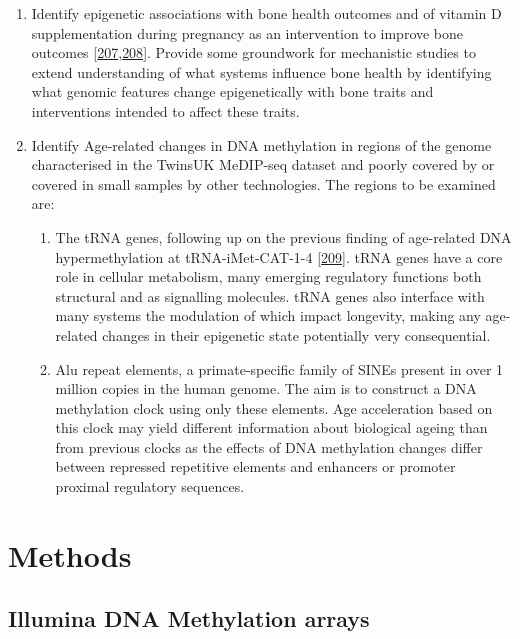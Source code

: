 \documentclass[
]{book}
\providecommand{\tightlist}{%
  \setlength{\itemsep}{0pt}\setlength{\parskip}{0pt}}
\begin{document}
\begin{enumerate}
\def\labelenumi{\arabic{enumi}.}
\item
  Identify epigenetic associations with bone health outcomes and of vitamin D supplementation during pregnancy as an intervention to improve bone outcomes {[}\protect\hyperlink{ref-Harvey2012a}{207},\protect\hyperlink{ref-Cooper2016}{208}{]}. Provide some groundwork for mechanistic studies to extend understanding of what systems influence bone health by identifying what genomic features change epigenetically with bone traits and interventions intended to affect these traits.
\item
  Identify Age-related changes in DNA methylation in regions of the genome characterised in the TwinsUK MeDIP-seq dataset and poorly covered by or covered in small samples by other technologies.
  The regions to be examined are:

  \begin{enumerate}
  \def\labelenumii{\alph{enumii}.}
  \tightlist
  \item
    The tRNA genes, following up on the previous finding of age-related DNA hypermethylation at tRNA-iMet-CAT-1-4 {[}\protect\hyperlink{ref-Bell2016}{209}{]}.
    tRNA genes have a core role in cellular metabolism, many emerging regulatory functions both structural and as signalling molecules.
    tRNA genes also interface with many systems the modulation of which impact longevity, making any age-related changes in their epigenetic state potentially very consequential.
  \item
    Alu repeat elements, a primate-specific family of SINEs present in over 1 million copies in the human genome.
    The aim is to construct a DNA methylation clock using only these elements.
    Age acceleration based on this clock may yield different information about biological ageing than from previous clocks as the effects of DNA methylation changes differ between repressed repetitive elements and enhancers or promoter proximal regulatory sequences.
  \end{enumerate}
\end{enumerate}

\hypertarget{methods}{%
\chapter{Methods}\label{methods}}

\hypertarget{GenMethodsMethArray}{%
\section{Illumina DNA Methylation arrays}\label{GenMethodsMethArray}}
\end{document}
